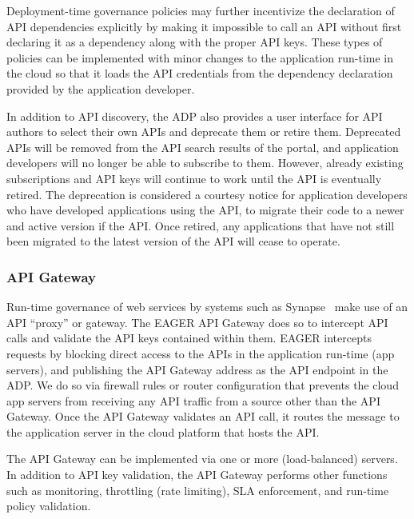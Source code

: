 Deployment-time governance policies
may further incentivize the declaration of API 
dependencies explicitly by making it 
impossible to call an API without first declaring it as a dependency along
with the proper API keys. These types of policies can be implemented
with minor changes to the
application run-time in the cloud so that it loads the API credentials from
the dependency declaration provided by the application developer.

In addition to API discovery, the ADP also provides a user
interface for API authors to select their own APIs and deprecate them or
retire them. Deprecated APIs will be removed from the API search
results of the portal, and application developers will no longer be able to 
subscribe to them. However, already existing subscriptions and API keys will continue
to work until the API is eventually retired. 
The deprecation is considered a courtesy notice for application developers
who have developed applications using the API, to migrate their code to a newer and active version
if the API. 
Once retired, any applications that have
not still been migrated to the latest version of the API will cease to operate.

\subsubsection{API Gateway} 
Run-time governance of web services by systems such as
Synapse~\cite{synapse} make use of an API ``proxy'' or gateway.
The EAGER API Gateway does so to intercept API calls and validate 
the API keys contained within them.
EAGER intercepts requests by blocking direct access to the APIs in the
application run-time (app servers), and publishing the API Gateway address as
the API endpoint in the ADP. We do so via firewall rules
or router configuration that prevents the cloud app servers from receiving any
API traffic from a source other than the API Gateway. Once the API Gateway validates
an API call, it routes the message to the
application server in the cloud platform that hosts the API.

The API Gateway can be implemented via one or more (load-balanced) servers.
In addition to API key validation, the API Gateway performs other
functions such as monitoring, throttling (rate limiting), SLA
enforcement, and run-time policy validation. 
